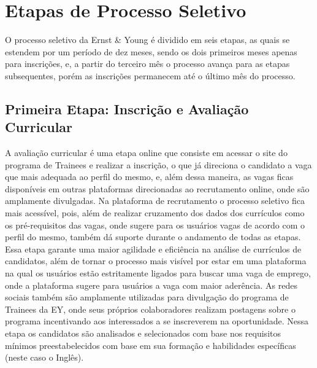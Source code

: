 
\chapter{Etapas de Processo Seletivo}

O processo seletivo da Ernst & Young é dividido em seis etapas, as quais se estendem por um período de dez meses, sendo os dois primeiros meses apenas para inscrições, e, a partir do terceiro mês o processo avança para as etapas subsequentes, porém as inscrições permanecem até o último mês do processo.




\section{Primeira Etapa: Inscrição e Avaliação Curricular}

A avaliação curricular é uma etapa online que consiste em acessar o site do programa de Trainees e realizar a inscrição, o que já direciona o candidato a vaga que mais adequada ao perfil do mesmo, e, além dessa maneira, as vagas ficas disponíveis em outras plataformas direcionadas ao recrutamento online, onde são amplamente divulgadas.
Na plataforma de recrutamento o processo seletivo fica mais acessível, pois, além de realizar cruzamento dos dados dos currículos como os pré-requisitos das vagas, onde sugere para os usuários vagas de acordo com o perfil do mesmo, também dá suporte durante o andamento de todas as etapas. 
Essa etapa garante uma maior agilidade e eficiência na análise de currículos de candidatos, além de tornar o processo mais visível por estar em uma plataforma na qual os usuários estão estritamente ligados para buscar uma vaga de emprego, onde a plataforma sugere para usuários a vaga com maior aderência.
As redes sociais também são amplamente utilizadas para divulgação do programa de Trainees da EY, onde seus próprios colaboradores realizam postagens sobre o programa incentivando aos interessados a se inscreverem na oportunidade.
Nessa etapa os candidatos são analisados e selecionados com base nos requisitos mínimos preestabelecidos com base em sua formação e habilidades específicas (neste caso o Inglês).





